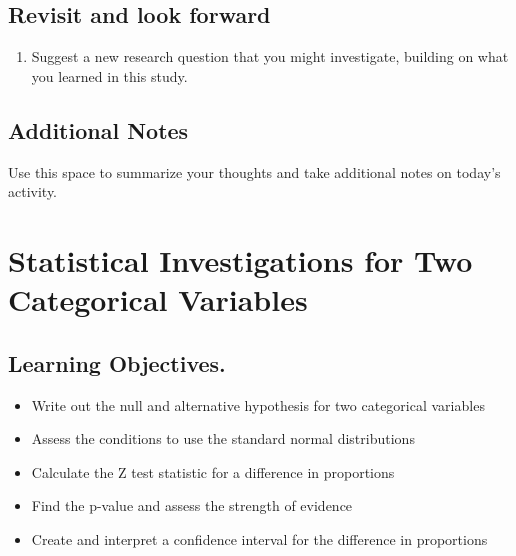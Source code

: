 \documentclass[
]{report}
\providecommand{\tightlist}{%
  \setlength{\itemsep}{0pt}\setlength{\parskip}{0pt}}
\begin{document}
\vspace{3in}

\hypertarget{revisit-and-look-forward}{%
\section{Revisit and look forward}\label{revisit-and-look-forward}}

\begin{enumerate}
\def\labelenumi{\arabic{enumi}.}
\setcounter{enumi}{28}
\tightlist
\item
  Suggest a new research question that you might investigate, building on what you learned in this study.
\end{enumerate}

\vspace{1in}

\hypertarget{additional-notes}{%
\section{Additional Notes}\label{additional-notes}}

Use this space to summarize your thoughts and take additional notes on today's activity.

\hypertarget{statistical-investigations-for-two-categorical-variables}{%
\chapter{Statistical Investigations for Two Categorical Variables}\label{statistical-investigations-for-two-categorical-variables}}

\hypertarget{learning-objectives.}{%
\section{Learning Objectives.}\label{learning-objectives.}}

\begin{itemize}
\item
  Write out the null and alternative hypothesis for two categorical variables
\item
  Assess the conditions to use the standard normal distributions
\item
  Calculate the Z test statistic for a difference in proportions
\item
  Find the p-value and assess the strength of evidence
\item
  Create and interpret a confidence interval for the difference in proportions
\end{itemize}
\end{document}
